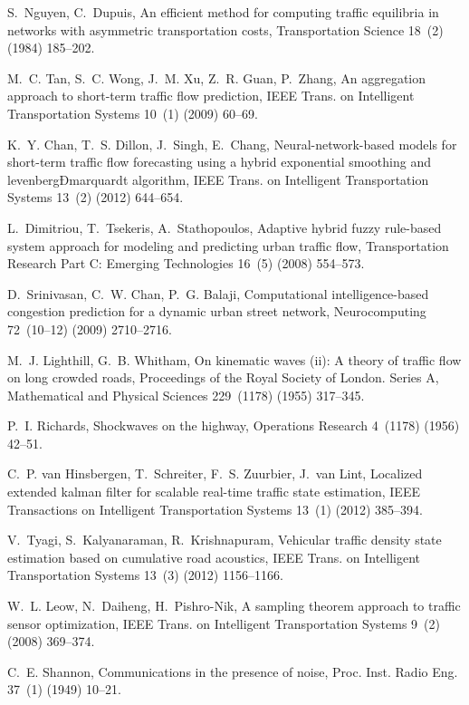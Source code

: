 \documentclass[10pt,onecolumn]{article}
\begin{document}
\begin{thebibliography}{00}
S.~Nguyen, C.~Dupuis, An efficient method for computing traffic equilibria in
  networks with asymmetric transportation costs, Transportation Science 18~(2)
  (1984) 185--202.

M.~C. Tan, S.~C. Wong, J.~M. Xu, Z.~R. Guan, P.~Zhang, An aggregation approach
  to short-term traffic flow prediction, IEEE Trans. on Intelligent
  Transportation Systems 10~(1) (2009) 60--69.

K.~Y. Chan, T.~S. Dillon, J.~Singh, E.~Chang, Neural-network-based models for
  short-term traffic flow forecasting using a hybrid exponential smoothing and
  levenbergÐmarquardt algorithm, IEEE Trans. on Intelligent Transportation
  Systems 13~(2) (2012) 644--654.

L.~Dimitriou, T.~Tsekeris, A.~Stathopoulos, Adaptive hybrid fuzzy rule-based
  system approach for modeling and predicting urban traffic flow,
  Transportation Research Part C: Emerging Technologies 16~(5) (2008) 554--573.

D.~Srinivasan, C.~W. Chan, P.~G. Balaji, Computational intelligence-based
  congestion prediction for a dynamic urban street network, Neurocomputing
  72~(10--12) (2009) 2710--2716.

M.~J. Lighthill, G.~B. Whitham, On kinematic waves (ii): A theory of traffic
  flow on long crowded roads, Proceedings of the Royal Society of London.
  Series A, Mathematical and Physical Sciences 229~(1178) (1955) 317--345.

P.~I. Richards, Shockwaves on the highway, Operations Research 4~(1178) (1956)
  42--51.

C.~P. van Hinsbergen, T.~Schreiter, F.~S. Zuurbier, J.~van Lint, Localized
  extended kalman filter for scalable real-time traffic state estimation, IEEE
  Transactions on Intelligent Transportation Systems 13~(1) (2012) 385--394.

V.~Tyagi, S.~Kalyanaraman, R.~Krishnapuram, Vehicular traffic density state
  estimation based on cumulative road acoustics, IEEE Trans. on Intelligent
  Transportation Systems 13~(3) (2012) 1156--1166.

W.~L. Leow, N.~Daiheng, H.~Pishro-Nik, A sampling theorem approach to traffic
  sensor optimization, IEEE Trans. on Intelligent Transportation Systems 9~(2)
  (2008) 369--374.

C.~E. Shannon, Communications in the presence of noise, Proc. Inst. Radio Eng.
  37~(1) (1949) 10--21.


\end{thebibliography}
\end{document}
